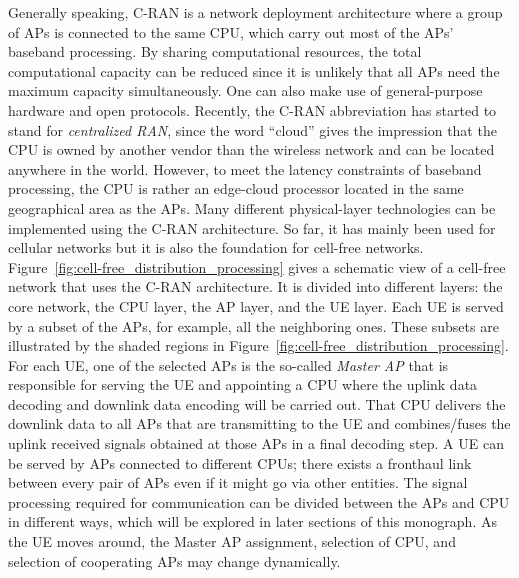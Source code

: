 Generally speaking, C-RAN is a network deployment architecture where a group of APs is connected to the same CPU, which carry out most of the APs' baseband processing. By sharing computational resources, the total computational capacity can be reduced since it is unlikely that all APs need the maximum capacity simultaneously. One can also make use of general-purpose hardware and open protocols. Recently, the C-RAN abbreviation has started to stand for \emph{centralized RAN}, since the word ``cloud'' gives the impression that the CPU is owned by another vendor than the wireless network and can be located anywhere in the world. However, to meet the latency constraints of baseband processing, the CPU is rather an edge-cloud processor located in the same geographical area as the APs.
Many different physical-layer technologies can be implemented using the C-RAN architecture. So far, it has mainly been used for cellular networks but it is also the foundation for cell-free networks.
Figure~\ref{fig:cell-free_distribution_processing} gives a schematic view of a cell-free network that uses the C-RAN architecture. It is divided into different layers: the core network, the \gls{CPU} layer, the \gls{AP} layer, and the \gls{UE} layer.
Each \gls{UE} is served by a subset of the \glspl{AP}, for example, all the neighboring ones. These subsets are illustrated by the shaded regions in Figure~\ref{fig:cell-free_distribution_processing}.
For each \gls{UE}, one of the selected \glspl{AP} is the so-called \emph{Master \gls{AP}} that is responsible for serving the \gls{UE} and appointing a \gls{CPU} where the uplink data decoding and downlink data encoding will be carried out. That \gls{CPU} delivers the downlink data to all \glspl{AP} that are transmitting to the \gls{UE} and combines/fuses the uplink received signals obtained at those \glspl{AP} in a final decoding step. 
A \gls{UE} can be served by \glspl{AP} connected to different \glspl{CPU}; there exists a fronthaul link between every pair of \glspl{AP} even if it might go via other entities.
The signal processing required for communication can be divided between the \glspl{AP} and \gls{CPU} in different ways, which will be explored in later sections of this monograph. 
As the \gls{UE} moves around, the Master \gls{AP} assignment, selection of \gls{CPU}, and selection of cooperating \glspl{AP} may change dynamically.

\enlargethispage{\baselineskip} 

